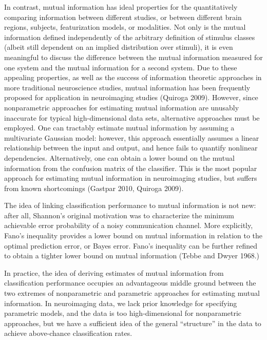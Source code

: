 \documentclass[12pt]{article}
\begin{document}
In contrast, mutual information has ideal properties for the quantitatively 
comparing information between different studies, or between different brain regions, subjects, featurization models, or modalities.
Not only is the mutual information defined independently of the arbitrary definition of stimulus classes (albeit still dependent on an
implied distribution over stimuli), it is even meaningful to discuss the difference between the mutual information measured for one system
and the mutual information for a second system.
Due to these appealing properties, as well as the success of information theoretic approaches in more traditional neuroscience studies,
mutual information has been frequently proposed for application in neuroimaging studies (Quiroga 2009).
However, since nonparametric approaches for estimating mutual information are unusably inaccurate for typical high-dimensional data sets,
alternative approaches must be employed.  One can tractably estimate mutual information by assuming a multivariate Gaussian model:
however, this approach essentially assumes a linear relationship between the input and output, and hence fails to quantify nonlinear dependencies.
Alternatively, one can obtain a lower bound on the mutual information from the confusion matrix of the classifier.
This is the most popular approach for estimating mutual information in neuroimaging studies, but suffers from known shortcomings
(Gastpar 2010, Quiroga 2009).

The idea of linking classification performance to mutual information is not new: 
after all, Shannon's original motivation was to characterize the minimum achievable error probability
of a noisy communication channel.  More explicitly, Fano's inequality provides a
lower bound on mutual information in relation to the optimal prediction error, or Bayes error.
Fano's inequality can be further refined to obtain a tighter lower bound on mutual information (Tebbe and Dwyer 1968.)

In practice, the idea of deriving estimates of mutual information from classification performance occupies an advantageous middle ground
between the two extremes of nonparametric and parametric approaches for estimating mutual information.
In neuroimaging data, we lack prior knowledge for specifying parametric models, and the data is too high-dimensional for nonparametric approaches,
but we have a sufficient idea of the general ``structure'' in the data to achieve above-chance classification rates.
\end{document}
